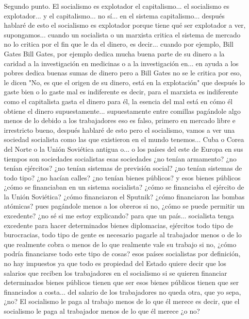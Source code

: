 Segundo punto. El socialismo es explotador
el capitalismo... el socialismo es explotador... y el capitalismo... no
sí... en el sistema capitalismo... después hablaré de esto el socialismo es explotador porque tiene qué ser explotador
a ver, supongamos... cuando un socialista o un marxista critica el sistema de mercado
no lo critica por el fin que le da el dinero, es decir... cuando por ejemplo, Bill Gates Bill Gates, por ejemplo
dedica mucha buena parte de su dinero a la caridad a la investigación en medicinas
o a la investigación en... en ayuda a los pobres dedica buenas sumas de dinero
pero a Bill Gates no se le critica por eso, le dicen "No, es que el origen de su dinero, está en la explotación"
que después lo gaste bien o lo gaste mal es indiferente es decir, para el marxista es indiferente como el capitalista gasta el dinero
para él, la esencia del mal está en cómo él obtiene el dinero supuestamente...
supuestamente entre comillas pagándole algo menos de lo debido a los trabajadores
eso es falso, primero en mercado libre e irrestricto bueno, después hablaré de esto pero el socialismo, vamos a ver una sociedad socialista
como las que existieron en el mundo tenemos... Cuba o Corea del Norte o la Unión Soviética antigua o...
o los países del este de Europa en sus tiempos son sociedades socialistas esas sociedades
¿no tenían armamento? ¿no tenían ejércitos? ¿no tenían sistemas de previsión social?
¿no tenían sistemas de todo tipo? ¿no hacían calles? ¿no tenían bienes públicos?
y esos bienes públicos ¿cómo se financiaban en un sistema socialista? ¿cómo se financiaba el ejército de la Unión Soviética?
¿cómo financiaron el Sputnik? ¿cómo financiaron las bombas atómicas? pues pagándole menos a los obreros
si no, ¿cómo se puede permitir un excedente? ¿no sé si me estoy explicando? para que un país... socialista tenga excedente
para hacer determinados bienes diplomacias, ejércitos todo tipo de burocracias, todo tipo de gente
es necesario pagarle al trabajador menos
o de lo que realmente cobra o menos de lo que realmente vale su trabajo
si no, ¿cómo podría financiarse todo este tipo de cosas? esos países socialistas por definición, no hay impuestos
ya que todo es propiedad del Estado quiere decir que los salarios que reciben los trabajadores en el socialismo
si se quieren financiar determinados bienes públicos tienen que ser esos bienes públicos tienen que ser financiados a costa...
del salario de los trabajadores no queda otra, que yo sepa, ¿no?
El socialismo le paga al trabajo menos de lo que él merece
es decir, que el socialismo le paga al trabajador menos de lo que él merece ¿o no?
